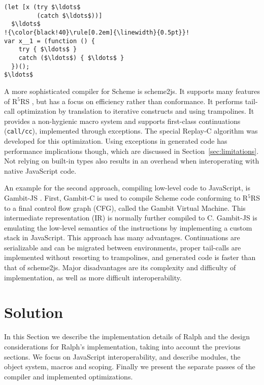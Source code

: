 \documentclass{acm_proc_article-sp}
\begin{document}
\begin{lstlisting}[escapechar=!,
    caption=Generation of closures for forms
            resulting in JavaScript statements,
    label=lst:try/catch]
(let [x (try $\ldots$
         (catch $\ldots$))]
  $\ldots$
!{\color{black!40}\rule[0.2em]{\linewidth}{0.5pt}}!
var x__1 = (function () {
    try { $\ldots$ }
    catch ($\ldots$) { $\ldots$ }
  })();
$\ldots$
\end{lstlisting}

A more sophisticated compiler for Scheme is scheme2js. It supports
many features of R$^5$RS \cite{R5RS}, but has a focus on efficiency
rather than conformance. It performs tail-call optimization by
translation to iterative constructs and using trampolines. It provides
a non-hygienic macro system and supports first-class continuations
(\texttt{call/cc}), implemented through exceptions. The special
Replay-C \cite{loitsch2009scm2js} algorithm was developed for this
optimization. Using exceptions in generated code has performance
implications though, which are discussed in
Section~\ref{sec:limitations}. Not relying on built-in types also
results in an overhead when interoperating with native JavaScript
code.

An example for the second approach, compiling low-level code to
JavaScript, is Gambit-JS \cite{thivierge2012}. First, Gambit-C is used
to compile Scheme code conforming to R$^5$RS to a final control flow
graph (CFG), called the Gambit Virtual Machine. This intermediate
representation (IR) is normally further compiled to C. Gambit-JS is
emulating the low-level semantics of the instructions by implementing
a custom stack in JavaScript. This approach has many advantages.
Continuations are serializable and can be migrated between
environments, proper tail-calls are implemented without resorting to
trampolines, and generated code is faster than that of scheme2js. Major
disadvantages are its complexity and difficulty of implementation, as
well as more difficult interoperability.

\section{Solution}\label{sec:solution}

In this Section we describe the implementation details of Ralph and
the design considerations for Ralph's implementation, taking into
account the previous sections. We focus on JavaScript interoperability,
and describe modules, the object system, macros and scoping. Finally
we present the separate passes of the compiler and implemented
optimizations.
\end{document}
